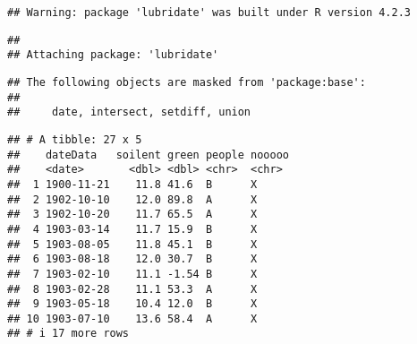 \documentclass[
]{article}
\newenvironment{Shaded}{\begin{snugshade}}{\end{snugshade}}
\newcommand{\AttributeTok}[1]{\textcolor[rgb]{0.13,0.29,0.53}{#1}}
\newcommand{\FunctionTok}[1]{\textcolor[rgb]{0.13,0.29,0.53}{\textbf{#1}}}
\newcommand{\NormalTok}[1]{#1}
\newcommand{\OtherTok}[1]{\textcolor[rgb]{0.56,0.35,0.01}{#1}}
\newcommand{\SpecialCharTok}[1]{\textcolor[rgb]{0.81,0.36,0.00}{\textbf{#1}}}
\newcommand{\StringTok}[1]{\textcolor[rgb]{0.31,0.60,0.02}{#1}}
\begin{document}
\begin{verbatim}
## Warning: package 'lubridate' was built under R version 4.2.3
\end{verbatim}

\begin{verbatim}
## 
## Attaching package: 'lubridate'
\end{verbatim}

\begin{verbatim}
## The following objects are masked from 'package:base':
## 
##     date, intersect, setdiff, union
\end{verbatim}

\begin{Shaded}
\end{Shaded}

\begin{verbatim}
## # A tibble: 27 x 5
##    dateData   soilent green people nooooo
##    <date>       <dbl> <dbl> <chr>  <chr> 
##  1 1900-11-21    11.8 41.6  B      X     
##  2 1902-10-10    12.0 89.8  A      X     
##  3 1902-10-20    11.7 65.5  A      X     
##  4 1903-03-14    11.7 15.9  B      X     
##  5 1903-08-05    11.8 45.1  B      X     
##  6 1903-08-18    12.0 30.7  B      X     
##  7 1903-02-10    11.1 -1.54 B      X     
##  8 1903-02-28    11.1 53.3  A      X     
##  9 1903-05-18    10.4 12.0  B      X     
## 10 1903-07-10    13.6 58.4  A      X     
## # i 17 more rows
\end{verbatim}

\begin{Shaded}
\end{Shaded}
\end{document}
